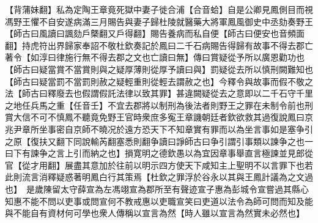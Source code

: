 【背蒲妹翻】私為定陶王章竟死獄中妻子徙合浦【合音蛤】自是公卿見鳳側目而視馮野王懼不自安遂病滿三月賜告與妻子歸杜陵就醫藥大將軍鳳風御史中丞劾奏野王【師古曰風讀曰諷劾戶槩翻又戶得翻】賜告養病而私自便【師古曰便安也音頻面翻】持虎符出界歸家奉詔不敬杜欽奏記於鳳曰二千石病賜告得歸有故事不得去郡亡著令【如淳曰律施行無不得去郡之文也亡讀曰無】傳曰賞疑從予所以廣恩勸功也【師古曰疑當賞不當賞則與之疑厚薄則從厚予讀曰與】罰疑從去所以慎刑闕難知也【師古曰疑當罰不當罰則赦之疑輕重則從輕去謂赦之也】今釋令與故事而假不敬之法【師古曰釋廢去也假謂假託法律以致其罪】甚違闕疑從去之意即以二千石守千里之地任兵馬之重【任音壬】不宜去郡將以制刑為後法者則野王之罪在未制令前也刑賞大信不可不慎鳳不聽竟免野王官時衆庶多寃王章譏朝廷者欽欲救其過復說鳳曰京兆尹章所坐事密自京師不曉况於遠方恐天下不知章實有罪而以為坐言事如是塞争引之原【復扶又翻下同說輸芮翻塞悉則翻争讀曰諍師古曰争引謂引事類以諫争之也一曰下有諫争之言上引而納之也】損寛明之德欽愚以為宜因章事舉直言極諫並見郎從官【從才用翻】展盡其意加於往前以明示四方使天下咸知主上聖明不以言罪下也若此則流言消釋疑惑著明鳳白行其策焉【杜欽之罪浮於谷永以其與王鳳計議為之文過也】　是歲陳留太守薛宣為左馮翊宣為郡所至有聲迹宣子惠為彭城令宣嘗過其縣心知惠不能不問以吏事或問宣何不教戒惠以吏職宣笑曰吏道以法令為師可問而知及能與不能自有資材何可學也衆人傳稱以宣言為然【時人雖以宣言為然實未必然也】

